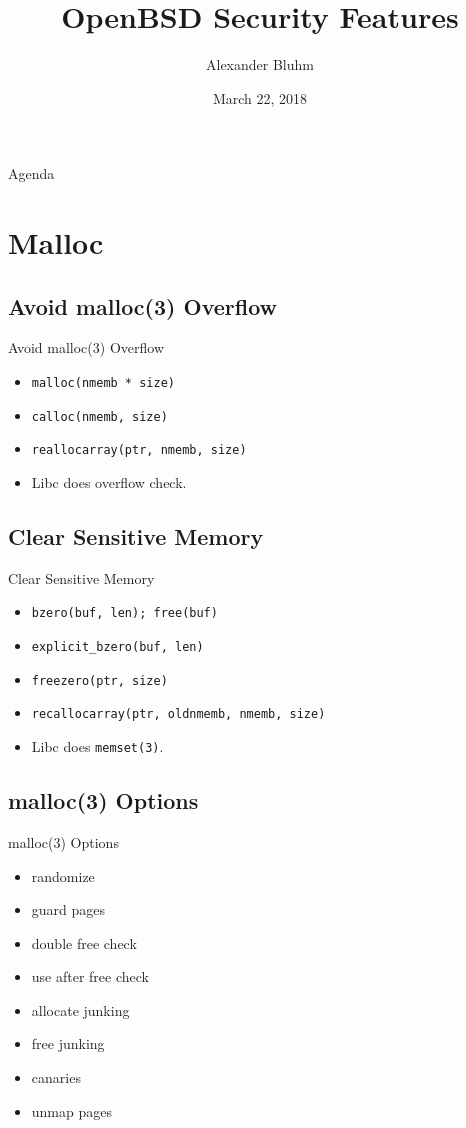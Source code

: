 \documentclass[14pt]{beamer}
\author{Alexander Bluhm}
\title{OpenBSD Security Features}
\institute{genua GmbH\\ \url{bluhm@genua.de}\\ \url{bluhm@openbsd.org}}
\date{March 22, 2018}
\begin{document}
\begin{frame}
\titlepage
\end{frame}

\begin{frame}{Agenda}
\setcounter{tocdepth}{1}
\tableofcontents
\end{frame}

\section{Malloc}

\subsection{Avoid malloc(3) Overflow}
\begin{frame}{Avoid malloc(3) Overflow}
\begin{itemize}
    \item \texttt{malloc(nmemb * size)}
    \item \texttt{calloc(nmemb, size)}
    \item \texttt{reallocarray(ptr, nmemb, size)}
    \item Libc does overflow check.
\end{itemize}
\end{frame}

\subsection{Clear Sensitive Memory}
\begin{frame}{Clear Sensitive Memory}
\begin{itemize}
    \item \texttt{bzero(buf, len); free(buf)}
    \item \texttt{explicit\_bzero(buf, len)}
    \item \texttt{freezero(ptr, size)}
    \item \texttt{recallocarray(ptr, oldnmemb, nmemb, size)}
    \item Libc does \texttt{memset(3)}.
\end{itemize}
\end{frame}

\subsection{malloc(3) Options}
\begin{frame}{malloc(3) Options}
\begin{itemize}
    \item randomize
    \item guard pages
    \item double free check
    \item use after free check
    \item allocate junking
    \item free junking
    \item canaries
    \item unmap pages
\end{itemize}
\end{frame}
\end{document}
